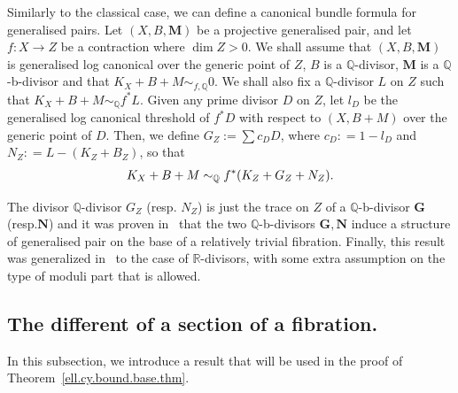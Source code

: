 \documentclass[11pt]{ip-journal}
\theoremstyle{definition}
\begin{document}
Similarly to the classical case, we can define a canonical bundle formula for generalised pairs. Let $(X,B, \mathbf M)$ be a projective generalised pair, and let $f \colon X \to Z$ be a contraction where $\dim Z > 0$. 
We shall assume that $(X,B, \mathbf M)$ is generalised log canonical over the generic point of $Z$, $B$ is a $\mathbb Q$-divisor, $\mathbf M$ is a $\mathbb Q$-b-divisor and that $K_X + B + M \sim_{f, \mathbb{Q}} 0$. 
We shall also fix a $\mathbb Q$-divisor $L$ on $Z$ such that $K_X + B + M \sim_\mathbb{Q} f^\ast L$. 
Given any prime divisor $D$ on $Z$, let $l_D$ be the generalised log canonical threshold of $f^\ast D$ with respect to $(X,B+M)$ over the generic point of $D$. 
Then, we define $G_Z:= \sum c_D D$, where $c_D : = 1-l_D$ and $N_Z : = L - (K_Z + B_Z)$, so that 
\begin{align}\notag
K_X + B + M \sim_\mathbb{Q} f^\ast (K_Z + G_Z + N_Z).
\end{align}

The divisor $\mathbb Q$-divisor $G_Z$ (resp. $N_Z$) is just the trace on $Z$ of a $\mathbb Q$-b-divisor $\mathbf{G}$ (resp.$\mathbf{N}$) and it was proven in~\cite{1807.04847} that the two $\mathbb Q$-b-divisors $\mathbf{G}, \mathbf N$ induce a structure of generalised pair on the base of a relatively trivial fibration.
Finally, this result was generalized in~\cite{MR4398255} to the case of $\mathbb R$-divisors, with some extra assumption on the type of moduli part that is allowed.

\subsection{The different of a section of a fibration.}
\label{subs.diff.sect}

In this subsection, we introduce a result that will be used in the proof of Theorem~\ref{ell.cy.bound.base.thm}.
\end{document}
